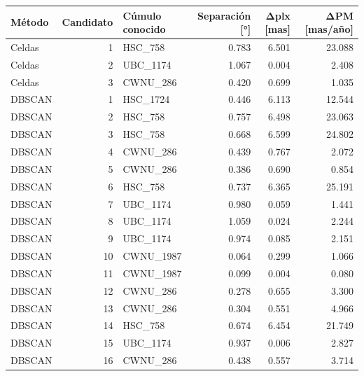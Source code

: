 \begin{tabular}{lrlrrr}
\toprule
Método & Candidato & Cúmulo conocido & Separación [°] & Δplx [mas] & ΔPM [mas/año] \\
\midrule
Celdas & 1 & HSC\_758 & 0.783 & 6.501 & 23.088 \\
Celdas & 2 & UBC\_1174 & 1.067 & 0.004 & 2.408 \\
Celdas & 3 & CWNU\_286 & 0.420 & 0.699 & 1.035 \\
DBSCAN & 1 & HSC\_1724 & 0.446 & 6.113 & 12.544 \\
DBSCAN & 2 & HSC\_758 & 0.757 & 6.498 & 23.063 \\
DBSCAN & 3 & HSC\_758 & 0.668 & 6.599 & 24.802 \\
DBSCAN & 4 & CWNU\_286 & 0.439 & 0.767 & 2.072 \\
DBSCAN & 5 & CWNU\_286 & 0.386 & 0.690 & 0.854 \\
DBSCAN & 6 & HSC\_758 & 0.737 & 6.365 & 25.191 \\
DBSCAN & 7 & UBC\_1174 & 0.980 & 0.059 & 1.441 \\
DBSCAN & 8 & UBC\_1174 & 1.059 & 0.024 & 2.244 \\
DBSCAN & 9 & UBC\_1174 & 0.974 & 0.085 & 2.151 \\
DBSCAN & 10 & CWNU\_1987 & 0.064 & 0.299 & 1.066 \\
DBSCAN & 11 & CWNU\_1987 & 0.099 & 0.004 & 0.080 \\
DBSCAN & 12 & CWNU\_286 & 0.278 & 0.655 & 3.300 \\
DBSCAN & 13 & CWNU\_286 & 0.304 & 0.551 & 4.966 \\
DBSCAN & 14 & HSC\_758 & 0.674 & 6.454 & 21.749 \\
DBSCAN & 15 & UBC\_1174 & 0.937 & 0.006 & 2.827 \\
DBSCAN & 16 & CWNU\_286 & 0.438 & 0.557 & 3.714 \\
\bottomrule
\end{tabular}
